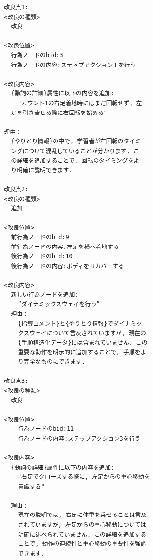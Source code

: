 \begin{tcolorbox}[breakable, colback=white, colframe=black]
    \begin{verbatim}
        改良点1:
        <改良の種類>
          改良
        
        <改良位置>
          行為ノードのbid:3
          行為ノードの内容:ステップアクション１を行う
        
        <改良内容>
          {動詞の詳細}属性に以下の内容を追加:
            "カウント1の右足着地時にはまだ回転せず, 左
          足を引き寄せる際に右回転を始める"
         
        理由：
          {やりとり情報}の中で, 学習者が右回転のタイミ
          ングについて混乱していることが分かります. こ
          の詳細を追加することで, 回転のタイミングをよ
          り明確に説明できます. 
        
        改良点2:
        <改良の種類>
          追加
        
        <改良位置>
          前行為ノードのbid:9
          前行為ノードの内容:左足を横へ着地する
          後行為ノードのbid:10
          後行為ノードの内容:ボディをリカバーする
        
        <改良内容>
          新しい行為ノードを追加:
            “ダイナミックスウェイを行う”
          理由：
            {指導コメント}と{やりとり情報}でダイナミッ
            クスウェイについて言及されていますが, 現在の
            {手順構造化データ}には含まれていません. この
            重要な動作を明示的に追加することで, 手順をよ
            り完全なものにできます. 
        
        改良点3:
        <改良の種類>
          改良
        
        <改良位置>
            行為ノードのbid:11
            行為ノードの内容:ステップアクション3を行う
        
        <改良内容>
          {動詞の詳細}属性に以下の内容を追加:
            "右足でクローズする際に, 左足からの重心移動を
            意識する"
         
          理由：
            現在の説明では, 右足に体重を乗せることは言及
            されていますが, 左足からの重心移動については
            明確に述べられていません. この詳細を追加する
            ことで, 動作の連続性と重心移動の重要性を強調
            できます. 
    \end{verbatim}
\end{tcolorbox}
    
\label{fig16}


